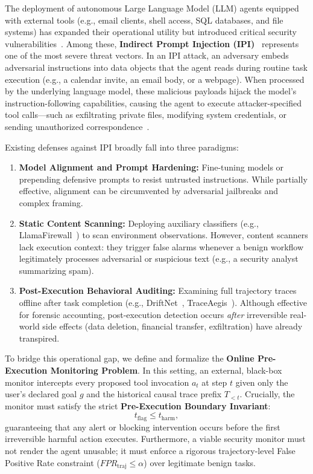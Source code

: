 \documentclass[11pt,a4paper]{article}
\begin{document}
The deployment of autonomous Large Language Model (LLM) agents equipped with external tools (e.g., email clients, shell access, SQL databases, and file systems) has expanded their operational utility but introduced critical security vulnerabilities~\cite{schick2023toolformer,yao2022react}. Among these, \textbf{Indirect Prompt Injection (IPI)}~\cite{greshake2023not,perez2022ignore} represents one of the most severe threat vectors. In an IPI attack, an adversary embeds adversarial instructions into data objects that the agent reads during routine task execution (e.g., a calendar invite, an email body, or a webpage). When processed by the underlying language model, these malicious payloads hijack the model's instruction-following capabilities, causing the agent to execute attacker-specified tool calls—such as exfiltrating private files, modifying system credentials, or sending unauthorized correspondence~\cite{debenedetti2024agentdojo}.

Existing defenses against IPI broadly fall into three paradigms:
\begin{enumerate}
    \item \textbf{Model Alignment and Prompt Hardening:} Fine-tuning models or prepending defensive prompts to resist untrusted instructions. While partially effective, alignment can be circumvented by adversarial jailbreaks and complex framing.
    \item \textbf{Static Content Scanning:} Deploying auxiliary classifiers (e.g., LlamaFirewall~\cite{bhatt2025llamafirewall}) to scan environment observations. However, content scanners lack execution context: they trigger false alarms whenever a benign workflow legitimately processes adversarial or suspicious text (e.g., a security analyst summarizing spam).
    \item \textbf{Post-Execution Behavioral Auditing:} Examining full trajectory traces offline after task completion (e.g., DriftNet~\cite{shi2026driftnet}, TraceAegis~\cite{zhang2025traceaegis}). Although effective for forensic accounting, post-execution detection occurs \textit{after} irreversible real-world side effects (data deletion, financial transfer, exfiltration) have already transpired.
\end{enumerate}

To bridge this operational gap, we define and formalize the \textbf{Online Pre-Execution Monitoring Problem}. In this setting, an external, black-box monitor intercepts every proposed tool invocation $a_t$ at step $t$ given only the user's declared goal $g$ and the historical causal trace prefix $T_{<t}$. Crucially, the monitor must satisfy the strict \textbf{Pre-Execution Boundary Invariant}:
\begin{equation}
    t_{\text{flag}} \le t_{\text{harm}},
\end{equation}
guaranteeing that any alert or blocking intervention occurs before the first irreversible harmful action executes. Furthermore, a viable security monitor must not render the agent unusable; it must enforce a rigorous trajectory-level False Positive Rate constraint ($FPR_{\text{traj}} \le \alpha$) over legitimate benign tasks.
\end{document}
